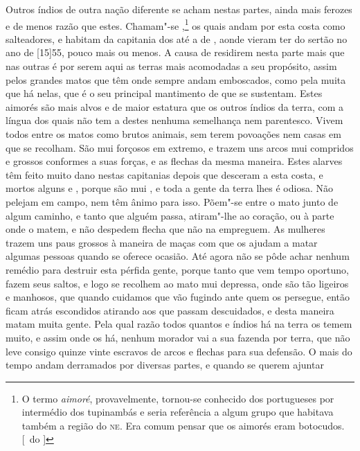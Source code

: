 Outros índios de outra nação diferente se acham nestas partes, ainda mais
ferozes e de menos razão que estes. Chamam"-se ,\footnote{ O
termo \textit{aimoré}, provavelmente, tornou-se conhecido 
dos portugueses por intermédio dos tupinambás e seria referência a algum grupo que
habitava também a região do \textsc{ne}. Era comum
pensar que os aimorés eram botocudos. [~do ]}
os quais andam									%
por esta costa como salteadores, e habitam da capitania dos  até
a de , aonde vieram ter do sertão no ano de [15]55, pouco mais
ou menos. A causa de residirem nesta parte mais que nas outras é por
serem aqui as terras mais acomodadas a seu propósito, assim pelos
grandes matos que têm onde sempre andam emboscados, como pela muita
 que há nelas, que é o seu principal mantimento de que se
sustentam. Estes aimorés são mais alvos e de maior estatura que os
outros índios da terra, com a língua dos quais não tem a destes nenhuma			%
semelhança nem parentesco. Vivem todos entre os matos como brutos
animais, sem terem povoações nem casas em que se recolham. São mui
forçosos em extremo, e trazem uns arcos mui compridos e grossos
conformes a suas forças, e as flechas da mesma maneira. Estes alarves
têm feito muito dano nestas capitanias depois que desceram a esta
costa, e mortos alguns  e , porque são mui ,
e toda a gente da terra lhes é odiosa. Não pelejam em campo, nem têm
ânimo para isso. Põem"-se entre o mato junto de algum caminho, e tanto
que alguém passa, atiram"-lhe ao coração, ou à parte onde o matem, e não
despedem flecha que não na empreguem. As mulheres trazem uns paus
grossos à maneira de maças com que os ajudam a matar algumas pessoas
quando se oferece ocasião. Até agora não se pôde achar nenhum remédio
para destruir esta pérfida gente, porque tanto que vem tempo oportuno,
fazem seus saltos, e logo se recolhem ao mato mui depressa, onde são
tão ligeiros e manhosos, que quando cuidamos que vão fugindo ante quem
os persegue, então ficam atrás escondidos atirando aos que passam
descuidados, e desta maneira matam muita gente. Pela qual razão todos
quantos  e índios há na terra os temem muito, e assim onde os 	%
há, nenhum morador vai a sua fazenda por terra, que não leve consigo
quinze vinte escravos de arcos e flechas para sua defensão. O mais do
tempo andam derramados por diversas partes, e quando se querem ajuntar
